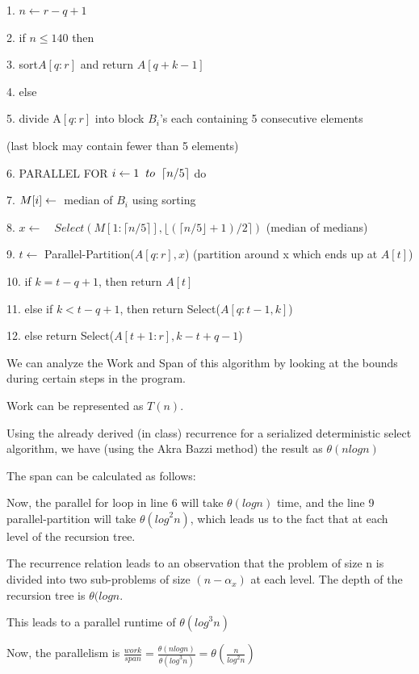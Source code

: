 \documentclass[11pt]{article}
\begin{document}
1. $n \leftarrow r-q+1$

2. if $n\leq 140 $ then

3. \quad sort$A[q:r]$ and return $A[q+k-1]$

4. else

5. \quad divide A$[q:r]$ into block $B_{i}$'s each containing 5 consecutive elements

\quad \quad \quad (last block may contain fewer than 5 elements)

6. PARALLEL FOR $i \leftarrow 1 \hspace{2mm} to \hspace{2mm} \lceil n/5 \rceil$ do

7. \quad $M[i] \leftarrow \hspace{1mm}$ median of $B_i$ using sorting

8. $x \leftarrow \quad Select(M[1:\lceil n/5\rceil], \lfloor (\lceil n/5 \rfloor + 1)/2 \rceil)$ (median of medians)

9. $t \leftarrow $ Parallel-Partition($A[q:r], x$) (partition around x which ends up at $A[t]$)

10. if $k=t-q+1$, then return $A[t]$

11. else if $k< t-q+1$, then return Select($A[q:t-1,k]$)

12. \quad else return Select($A[t+1:r],k-t+q-1$)

\medskip

We can analyze the Work and Span of this algorithm by looking at the bounds during certain steps in the program. 

Work can be represented as $T(n)$.

Using the already derived (in class) recurrence for a serialized deterministic select algorithm, we have (using the Akra Bazzi method) the result as $\theta(n log n)$ 

The span can be calculated as follows:

Now, the parallel for loop in line 6 will take $\theta(log n)$ time, and the line 9 parallel-partition will take $\theta({log}^2 n)$, which leads us to the fact that at each level of the recursion tree.

The recurrence relation leads to an observation that the problem of size n is divided into two sub-problems of size $(n-{\alpha}_x)$ at each level. The depth of the recursion tree is $\theta ({log} n$. 

This leads to a parallel runtime of $\theta ({log}^3 n)$

Now, the parallelism is $\frac{work}{span} = \frac{\theta(nlogn)}{\theta ({log}^3 n)} = \theta (\frac{n}{{log}^2 n})$
\end{document}
